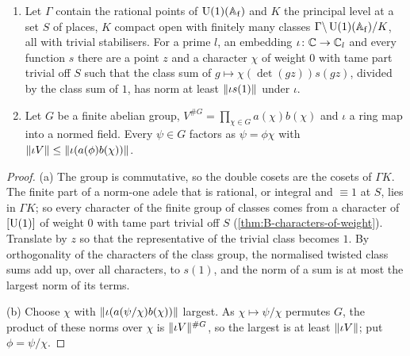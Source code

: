 \begin{lemma}\label{lem:class-averaging}
\begin{enumerate}[label=\textup{(\alph*)}]
\item Let $\Gamma$ contain the rational points of $\operatorname{U}(1)(\mathbb{A}_{\rm f})$ and $K$ the principal level at a set $S$ of places, $K$ compact open with finitely many classes $\Gamma\backslash\operatorname{U}(1)(\mathbb{A}_{\rm f})/K$, all with trivial stabilisers.
For a prime $l$, an embedding $\iota\colon\mathbb{C}\to\mathbb{C}_l$ and every function $s$ there are a point $z$ and a character $\chi$ of weight $0$ with tame part trivial off $S$ such that the class sum of $g\mapsto\chi(\det(gz))s(gz)$, divided
by the class sum of $1$, has norm at least $\lVert \iota s(1)\rVert$ under $\iota$.
\item Let $G$ be a finite abelian group, $V^{\#G}=\prod_{\chi\in G}a(\chi)b(\chi)$ and $\iota$ a ring map into a normed field. Every $\psi\in G$ factors as $\psi=\phi\chi$ with $\lVert \iota V\rVert\le\lVert \iota(a(\phi)b(\chi))\rVert$.
\end{enumerate}
\end{lemma}

\begin{proof}
(a) The group is commutative, so the double cosets are the cosets of $\Gamma K$. The finite part of a norm-one adele that is rational, or integral and $\equiv1$ at $S$, lies in $\Gamma K$; so every character of the finite group
of classes comes from a character of $[\operatorname{U}(1)]$ of weight $0$ with tame part trivial off $S$ (\cref{thm:B-characters-of-weight}). Translate by $z$ so that the representative of the trivial class becomes $1$. By orthogonality of the
characters of the class group, the normalised twisted class sums add up, over all characters, to $s(1)$, and the norm of a sum is at most the largest norm of its terms.

(b) Choose $\chi$ with $\lVert \iota(a(\psi/\chi)b(\chi))\rVert$ largest. As $\chi\mapsto\psi/\chi$ permutes $G$, the product of these norms over $\chi$ is $\lVert \iota V\rVert^{\#G}$, so the largest is at least $\lVert \iota V\rVert$; put $\phi=\psi/\chi$.
\end{proof}

